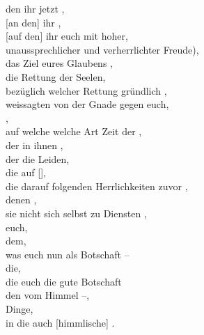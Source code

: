                 den ihr jetzt  ,\\
                 [an den] ihr  , \\
                [auf den] ihr euch  mit hoher,\\
                unaussprechlicher und verherrlichter Freude),\\
        das Ziel eures Glaubens ,\\ 
            die Rettung der Seelen, \\
                bezüglich welcher Rettung  gründlich   , \\
                 weissagten von der Gnade gegen euch, \\
                ,\\
                auf welche 
                 welche Art Zeit der  , \\
                    der in ihnen ,\\
                    der die Leiden,\\
                    die auf  [],\\
                 die darauf folgenden Herrlichkeiten zuvor , \\
            denen ,\\
                 sie nicht sich selbst zu Diensten ,\\
                 euch,\\
                 dem, \\
                was euch nun als Botschaft  – \\
                 die, \\
                die euch die gute Botschaft \\
                 den vom Himmel   –, \\
                Dinge, \\
                in die auch [himmlische]  . 

